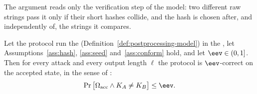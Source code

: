 
The argument reads only the verification step of the model: two different
raw strings pass it only if their short hashes collide, and the hash is
chosen after, and independently of, the strings it compares.

\begin{lemma}\label{lem:ev-correctness}
Let the protocol run the 
(Definition~\ref{def:postprocessing-model}) in the
, let Assumptions~\ref{ass:hash},
\ref{ass:seed} and~\ref{ass:conform} hold, and let $\eev\in(0,1]$. Then for every attack and
every output length $\ell$ the protocol is $\eev$-correct on the accepted
state, in the sense of \cite[Sec.~2.3.1, Def.~2.2, Eq.~(4)]{tupkary2025survey}:
\begin{equation}\label{eq:ev-correct}
  \Pr\big[\Omega_{\mathrm{acc}}\wedge K_A\ne K_B\big]\le\eev .
\end{equation}
\end{lemma}

